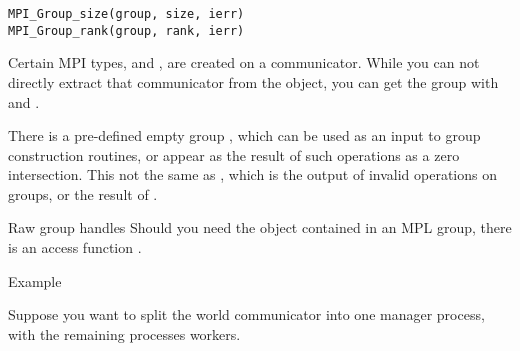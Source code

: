 \begin{lstlisting}
MPI_Group_size(group, size, ierr)
MPI_Group_rank(group, rank, ierr)
\end{lstlisting}

Certain MPI types,  and ,
are created on a communicator.
While you can not directly extract that communicator from the object,
you can get the group with
 and .

There is a pre-defined empty group ,
which can be used as an input to group construction routines,
or appear as the result of such operations as a zero intersection.
This not the same as ,
which is the output of invalid operations on groups,
or the result of .

\begin{mplnote}{Raw group handles}
  Should you need the  object
  contained in an MPL group,
  there is an access function .
\end{mplnote}

 {Example}

Suppose you want to split the world communicator into
one manager process, with the remaining processes workers.
%
